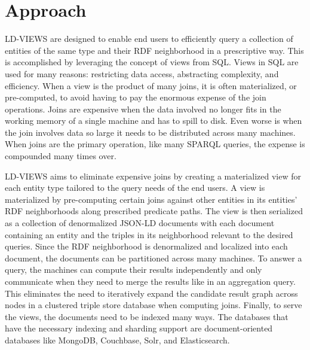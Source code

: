 \section{Approach}
\label{sec:approach}



LD-VIEWS are designed to enable end users to efficiently query a collection of entities of the same type and their RDF neighborhood in a prescriptive way.   
This is accomplished by leveraging the concept of views from SQL.  
Views in SQL are used for many reasons: restricting data access, abstracting complexity, and efficiency. 
When a view is the product of many joins, it is often materialized, or pre-computed, to avoid having to pay the enormous expense of the join operations.  
Joins are expensive when the data involved no longer fits in the working memory of a single machine and has to spill to disk.  
Even worse is when the join involves data so large it needs to be distributed across many machines.  
When joins are the primary operation, like many SPARQL queries, the expense is compounded many times over.

LD-VIEWS aims to eliminate expensive joins by creating a materialized view for each entity type tailored to the query needs of the end users.  
A view is materialized by pre-computing certain joins against other entities in its entities' RDF neighborhoods along prescribed predicate paths.  
The view is then serialized as a collection of denormalized JSON-LD documents with each document containing an entity and the triples in its neighborhood relevant to the desired queries.  
Since the RDF neighborhood is denormalized and localized into each document, the documents can be partitioned across many machines.
To answer a query, the machines can compute their results independently and only communicate when they need to merge the results like in an aggregation query.
This eliminates the need to iteratively expand the candidate result graph across nodes in a clustered triple store database when computing joins.  
Finally, to serve the views, the documents need to be indexed many ways.
The databases that have the necessary indexing and sharding support are document-oriented databases like MongoDB, Couchbase, Solr, and Elasticsearch.  

